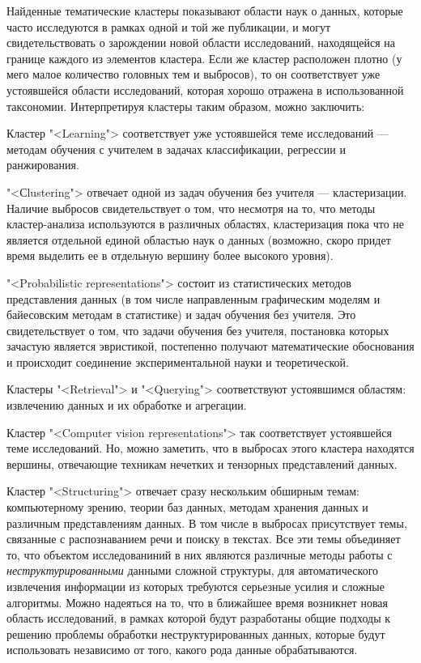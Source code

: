 \documentclass[12pt]{article}
\newenvironment{alphaenumerate*}
{\begin{enumerate}[label=(\asbuk*), ref=(\asbuk*)]
	\setlength{\itemsep}{0pt}
	\setlength{\parskip}{0pt}}
{\end{enumerate}}
\begin{document}
Найденные тематические кластеры показывают области наук о данных, которые часто исследуются в рамках одной и той же публикации, и могут свидетельствовать о зарождении новой области исследований, находящейся на границе каждого из элементов кластера. Если же кластер расположен плотно (у мего малое количество головных тем и выбросов), то он соответствует уже устоявшейся области исследований, которая хорошо отражена в использованной таксономии. Интерпретируя кластеры таким образом, можно заключить:

\begin{alphaenumerate*}
	\item Кластер "<Learning"> соответствует уже устоявшейся теме исследований --- методам обучения с учителем в задачах классификации, регрессии и ранжирования.
	\item  "<Сlustering"> отвечает одной из задач обучения без учителя --- кластеризации. Наличие выбросов свидетельствует о том, что несмотря на то, что методы кластер-анализа используются в различных областях, кластеризация пока что не является отдельной единой областью наук о данных (возможно, скоро придет время выделить ее в отдельную вершину более высокого уровня). 
	\item "<Probabilistic representations"> состоит из статистических методов представления данных (в том числе направленным графическим моделям и байесовским методам в статистике) и задач обучения без учителя. Это свидетельствует о том, что задачи обучения без учителя, постановка которых зачастую является эвристикой, постепенно получают математические обоснования и происходит соединение экспериментальной науки и теоретической.
	\item Кластеры "<Retrieval"> и "<Querying"> соответствуют устоявшимся областям: извлечению данных и их обработке и агрегации.
	\item Кластер "<Computer vision representations"> так соответствует устоявшейся теме исследований. Но, можно заметить, что в выбросах этого кластера находятся вершины, отвечающие техникам нечетких и тензорных представлений данных.
	\item Кластер "<Structuring"> отвечает сразу нескольким обширным темам: компьютерному зрению, теории баз данных, методам хранения данных и различным представлениям данных. В том числе в выбросах присутствует темы, связанные с распознаванием речи и поиску в текстах. Все  эти темы объединяет то, что объектом исследованиний в них являются различные методы работы с \emph{неструктурированными} данными сложной структуры, для автоматического извлечения информации из которых требуются серьезные усилия и сложные алгоритмы. Можно надеяться на то, что в ближайшее время возникнет новая область исследований, в рамках которой будут разработаны общие подходы к решению проблемы обработки неструктурированных данных, которые будут использовать независимо от того, какого рода данные обрабатываются. 
\end{alphaenumerate*}
\end{document}
